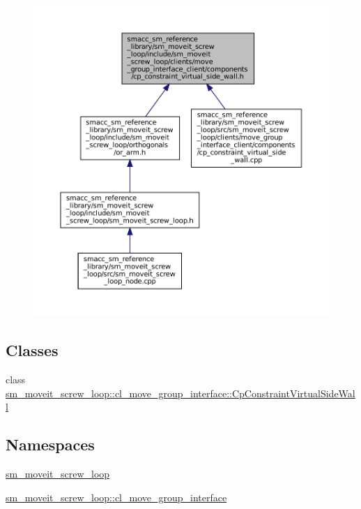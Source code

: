 \begin{figure}[H]
\begin{center}
\leavevmode
\includegraphics[width=350pt]{sm__moveit__screw__loop_2include_2sm__moveit__screw__loop_2clients_2move__group__interface__cliea513d60454440188c59edf1482605f83}
\end{center}
\end{figure}
\subsection*{Classes}
\begin{DoxyCompactItemize}
\item 
class \hyperlink{classsm__moveit__screw__loop_1_1cl__move__group__interface_1_1CpConstraintVirtualSideWall}{sm\+\_\+moveit\+\_\+screw\+\_\+loop\+::cl\+\_\+move\+\_\+group\+\_\+interface\+::\+Cp\+Constraint\+Virtual\+Side\+Wall}
\end{DoxyCompactItemize}
\subsection*{Namespaces}
\begin{DoxyCompactItemize}
\item 
 \hyperlink{namespacesm__moveit__screw__loop}{sm\+\_\+moveit\+\_\+screw\+\_\+loop}
\item 
 \hyperlink{namespacesm__moveit__screw__loop_1_1cl__move__group__interface}{sm\+\_\+moveit\+\_\+screw\+\_\+loop\+::cl\+\_\+move\+\_\+group\+\_\+interface}
\end{DoxyCompactItemize}
